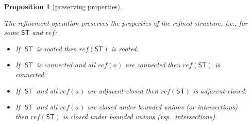 \documentclass[submission,copyright,creativecommons]{eptcs}
\newtheorem{proposition}[theorem]{Proposition}
\newcommand\ST{\ensuremath{\mathsf{ST}}}
\newcommand\reffun{\ensuremath{\mathit{ref}}}
\begin{document}
\begin{proposition}[preserving properties]\label{def_ref3}\ 

The refinement operation preserves the properties of the refined structure, i.e., for some $\ST$ and $\reffun$:
\begin{itemize}
\item If\,\ \ST\ is rooted then $\reffun(\ST)$ is rooted.
\item If\,\ \ST\ is connected and all $\reffun(a)$ are connected then $\reffun(\ST)$ is connected.
\item If\,\ \ST\ and all $\reffun(a)$ are adjacent-closed then $\reffun(\ST)$ is adjacent-closed.
\item If\,\ \ST\ and all $\reffun(a)$ are closed under bounded unions (or intersections) then $\reffun(\ST)$ is closed under bounded unions (rsp.\ intersections).
\end{itemize}
\end{proposition}
\end{document}
